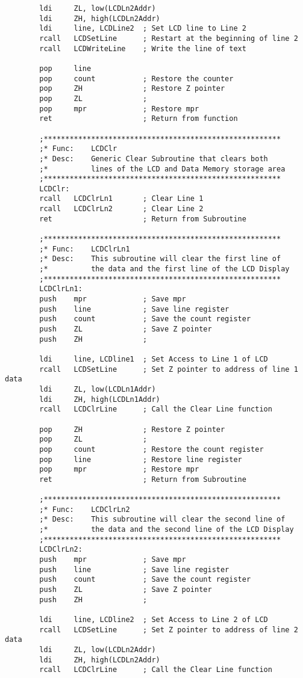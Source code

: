 \documentclass[12pt,letterpaper]{article}
\begin{document}
\begin{verbatim}
	    ldi		ZL, low(LCDLn2Addr)
	    ldi		ZH, high(LCDLn2Addr)		 
	    ldi		line, LCDLine2	; Set LCD line to Line 2
	    rcall	LCDSetLine		; Restart at the beginning of line 2
	    rcall	LCDWriteLine	; Write the line of text
	    
	    pop		line
	    pop		count			; Restore the counter
	    pop		ZH				; Restore Z pointer
	    pop		ZL				;
	    pop 	mpr				; Restore mpr
	    ret						; Return from function
	    
	    ;*******************************************************
	    ;* Func:	LCDClr
	    ;* Desc:	Generic Clear Subroutine that clears both 
	    ;*			lines of the LCD and Data Memory storage area
	    ;*******************************************************
	    LCDClr:
	    rcall	LCDClrLn1		; Clear Line 1
	    rcall	LCDClrLn2		; Clear Line 2
	    ret						; Return from Subroutine
	    
	    ;*******************************************************
	    ;* Func:	LCDClrLn1
	    ;* Desc:	This subroutine will clear the first line of 
	    ;*			the data and the first line of the LCD Display
	    ;*******************************************************
	    LCDClrLn1:
	    push	mpr				; Save mpr
	    push	line			; Save line register
	    push	count			; Save the count register
	    push	ZL				; Save Z pointer
	    push	ZH				;
	    
	    ldi		line, LCDline1	; Set Access to Line 1 of LCD
	    rcall	LCDSetLine		; Set Z pointer to address of line 1 data
	    ldi		ZL, low(LCDLn1Addr)
	    ldi		ZH, high(LCDLn1Addr)
	    rcall	LCDClrLine		; Call the Clear Line function
	    
	    pop		ZH				; Restore Z pointer
	    pop		ZL				;
	    pop		count			; Restore the count register
	    pop		line			; Restore line register
	    pop		mpr				; Restore mpr
	    ret						; Return from Subroutine
	    
	    ;*******************************************************
	    ;* Func:	LCDClrLn2
	    ;* Desc:	This subroutine will clear the second line of 
	    ;*			the data and the second line of the LCD Display
	    ;*******************************************************
	    LCDClrLn2:
	    push	mpr				; Save mpr
	    push	line			; Save line register
	    push	count			; Save the count register
	    push	ZL				; Save Z pointer
	    push	ZH				;
	    
	    ldi		line, LCDline2	; Set Access to Line 2 of LCD
	    rcall	LCDSetLine		; Set Z pointer to address of line 2 data
	    ldi		ZL, low(LCDLn2Addr)
	    ldi		ZH, high(LCDLn2Addr)
	    rcall	LCDClrLine		; Call the Clear Line function
	    

\end{verbatim}
\end{document}
